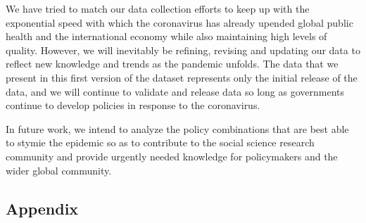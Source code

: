 \documentclass[]{article}
\begin{document}
We have tried to match our data collection efforts to keep up with the exponential speed with which the coronavirus has already upended global public health and the international economy while also maintaining high levels of quality. However, we will inevitably be refining, revising and updating our data to reflect new knowledge and trends as the pandemic unfolds. The data that we present in this first version of the dataset represents only the initial release of the data, and we will continue to validate and release data so long as governments continue to develop policies in response to the coronavirus.

In future work, we intend to analyze the policy combinations that are best able to stymie the epidemic so as to contribute to the social science research community and provide urgently needed knowledge for policymakers and the wider global community.

\hypertarget{appendix}{%
\subsection*{Appendix}\label{appendix}}
\end{document}
